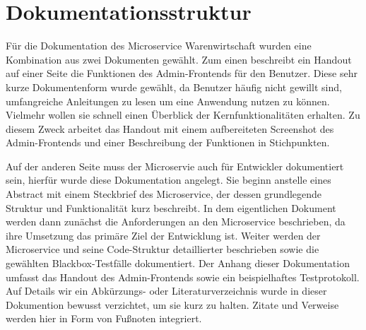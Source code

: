 \section{Dokumentationsstruktur}
\label{sec: Dokumentationsstruktur}

Für die Dokumentation des Microservice Warenwirtschaft wurden eine Kombination aus zwei Dokumenten gewählt. Zum einen beschreibt ein Handout auf einer Seite die Funktionen des Admin-Frontends für den Benutzer. Diese sehr kurze Dokumentenform wurde gewählt, da Benutzer häufig nicht gewillt sind, umfangreiche Anleitungen zu lesen um eine Anwendung nutzen zu können. Vielmehr wollen sie schnell einen Überblick der Kernfunktionalitäten erhalten. Zu diesem Zweck arbeitet das Handout mit einem aufbereiteten Screenshot des Admin-Frontends und einer Beschreibung der Funktionen in Stichpunkten. \par 
Auf der anderen Seite muss der Microservie auch für Entwickler dokumentiert sein, hierfür wurde diese Dokumentation angelegt. Sie beginn anstelle eines Abstract mit einem Steckbrief des Microservice, der dessen grundlegende Struktur und Funktionalität kurz beschreibt. In dem eigentlichen Dokument werden dann zunächst die Anforderungen an den Microservice beschrieben, da ihre Umsetzung das primäre Ziel der Entwicklung ist. Weiter werden der Microservice und seine Code-Struktur detaillierter beschrieben sowie die gewählten Blackbox-Testfälle dokumentiert. Der Anhang dieser Dokumentation umfasst das Handout des Admin-Frontends sowie ein beispielhaftes Testprotokoll. Auf Details wir ein Abkürzungs- oder Literaturverzeichnis wurde in dieser Dokumention bewusst verzichtet, um sie kurz zu halten. Zitate und Verweise werden hier in Form von Fußnoten integriert.